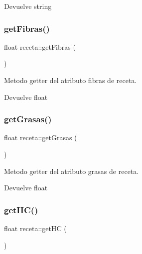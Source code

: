 \begin{DoxyReturn}{Devuelve}
string 
\end{DoxyReturn}
\mbox{\label{classreceta_a13819688407b0e6927a295cee0948cef}} 
\subsubsection{\texorpdfstring{get\+Fibras()}{getFibras()}}
{\footnotesize\ttfamily float receta\+::get\+Fibras (\begin{DoxyParamCaption}{ }\end{DoxyParamCaption})}



Metodo getter del atributo fibras de receta. 

\begin{DoxyReturn}{Devuelve}
float 
\end{DoxyReturn}
\mbox{\label{classreceta_ab1c63c527e92f4a525a1288e68f6d895}} 
\subsubsection{\texorpdfstring{get\+Grasas()}{getGrasas()}}
{\footnotesize\ttfamily float receta\+::get\+Grasas (\begin{DoxyParamCaption}{ }\end{DoxyParamCaption})}



Metodo getter del atributo grasas de receta. 

\begin{DoxyReturn}{Devuelve}
float 
\end{DoxyReturn}
\mbox{\label{classreceta_a4e18d86d43f1550fc3f79e925dd3dbac}} 
\subsubsection{\texorpdfstring{get\+H\+C()}{getHC()}}
{\footnotesize\ttfamily float receta\+::get\+HC (\begin{DoxyParamCaption}{ }\end{DoxyParamCaption})}



